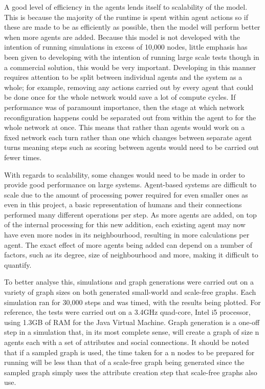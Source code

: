 \documentclass[]{report}
\begin{document}
A good level of efficiency in the agents lends itself to scalability of the model. This is because the majority of the runtime is spent within agent actions so if these are made to be as efficiently as possible, then the model will perform better when more agents are added. Because this model is not developed with the intention of running simulations in excess of 10,000 nodes, little emphasis has been given to developing with the intention of running large scale tests though in a commercial solution, this would be very important. Developing in this manner requires attention to be split between individual agents and the system as a whole; for example, removing any actions carried out by every agent that could be done once for the whole network would save a lot of compute cycles. If performance was of paramount importance, then the stage at which network reconfiguration happens could be separated out from within the agent to for the whole network at once. This means that rather than agents would work on a fixed network each turn rather than one which changes between separate agent turns meaning steps such as scoring between agents would need to be carried out fewer times.

With regards to scalability, some changes would need to be made in order to provide good performance on large systems. Agent-based systems are difficult to scale due to the amount of processing power required for even smaller ones as even in this project, a basic representation of humans and their connections performed many different operations per step. As more agents are added, on top of the internal processing for this new addition, each existing agent may now have even more nodes in its neighbourhood, resulting in more calculations per agent. The exact effect of more agents being added can depend on a number of factors, such as its degree, size of neighbourhood and more, making it difficult to quantify.

To better analyse this, simulations and graph generations were carried out on a variety of graph sizes on both generated small-world and scale-free graphs. Each simulation ran for 30,000 steps and was timed, with the results being plotted. For reference, the tests were carried out on a 3.4GHz quad-core, Intel i5 processor, using 1.3GB of RAM for the Java Virtual Machine. Graph generation is a one-off step in a simulation that, in its most complete sense, will create a graph of size n agents each with a set of attributes and social connections. It should be noted that if a sampled graph is used, the time taken for a n nodes to be prepared for running will be less than that of a scale-free graph being generated since the sampled graph simply uses the attribute creation step that scale-free graphs also use.
\end{document}
